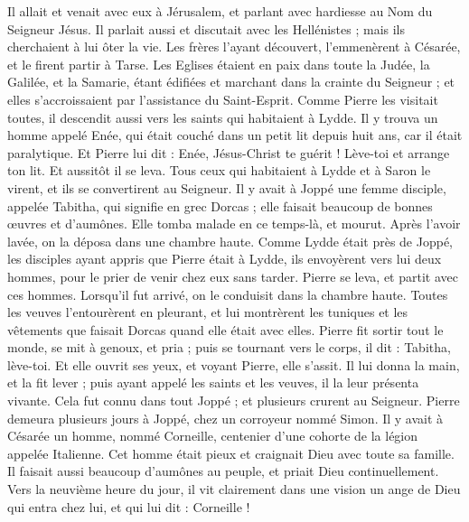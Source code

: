 \begin{multicols}{2}
Il allait et venait avec eux à Jérusalem, et parlant avec hardiesse au Nom du Seigneur Jésus.
Il parlait aussi et discutait avec les Hellénistes ; mais ils cherchaient à lui ôter la vie.
Les frères l’ayant découvert, l’emmenèrent à Césarée, et le firent partir à Tarse.
Les Eglises étaient en paix dans toute la Judée, la Galilée, et la Samarie, étant édifiées et marchant dans la crainte du Seigneur ; et elles s’accroissaient par l’assistance du Saint-Esprit.
Comme Pierre les visitait toutes, il descendit aussi vers les saints qui habitaient à Lydde.
Il y trouva un homme appelé Enée, qui était couché dans un petit lit depuis huit ans, car il était paralytique.
Et Pierre lui dit : Enée, Jésus-Christ te guérit ! Lève-toi et arrange ton lit. Et aussitôt il se leva.
Tous ceux qui habitaient à Lydde et à Saron le virent, et ils se convertirent au Seigneur.
Il y avait à Joppé une femme disciple, appelée Tabitha, qui signifie en grec Dorcas ; elle faisait beaucoup de bonnes œuvres et d'aumônes.
Elle tomba malade en ce temps-là, et mourut. Après l’avoir lavée, on la déposa dans une chambre haute.
Comme Lydde était près de Joppé, les disciples ayant appris que Pierre était à Lydde, ils envoyèrent vers lui deux hommes, pour le prier de venir chez eux sans tarder.
Pierre se leva, et partit avec ces hommes. Lorsqu’il fut arrivé, on le conduisit dans la chambre haute. Toutes les veuves l’entourèrent en pleurant, et lui montrèrent les tuniques et les vêtements que faisait Dorcas quand elle était avec elles.
Pierre fit sortir tout le monde, se mit à genoux, et pria ; puis se tournant vers le corps, il dit : Tabitha, lève-toi. Et elle ouvrit ses yeux, et voyant Pierre, elle s’assit.
Il lui donna la main, et la fit lever ; puis ayant appelé les saints et les veuves, il la leur présenta vivante.
Cela fut connu dans tout Joppé ; et plusieurs crurent au Seigneur.
Pierre demeura plusieurs jours à Joppé, chez un corroyeur nommé Simon.
\VerseOne{}Il y avait à Césarée un homme, nommé Corneille, centenier d'une cohorte de la légion appelée Italienne.
Cet homme était pieux et craignait Dieu avec toute sa famille. Il faisait aussi beaucoup d'aumônes au peuple, et priait Dieu continuellement.
Vers la neuvième heure du jour, il vit clairement dans une vision un ange de Dieu qui entra chez lui, et qui lui dit : Corneille !

\end{multicols}
